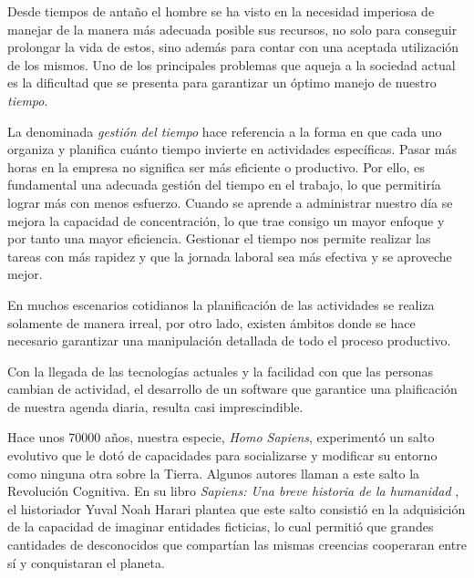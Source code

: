 \begin{introduction}
	Desde tiempos de antaño el hombre se ha visto en la necesidad imperiosa de manejar de la manera más adecuada posible sus recursos, no solo para conseguir prolongar la vida de estos, sino además para contar con una aceptada utilización de los mismos. Uno de los principales problemas que aqueja a la sociedad actual es la dificultad que se presenta para garantizar un óptimo manejo de nuestro \textit{tiempo}.
	
	La denominada \textit{gestión del tiempo} hace referencia a la forma en que cada uno organiza y planifica cuánto tiempo invierte en actividades específicas. Pasar más horas en la empresa no significa ser más eficiente o productivo. Por ello, es fundamental una adecuada gestión del tiempo en el trabajo, lo que permitiría lograr más con menos esfuerzo. Cuando se aprende a administrar nuestro día se mejora la capacidad de concentración, lo que trae consigo un mayor enfoque y por tanto una mayor eficiencia. Gestionar el tiempo nos permite realizar las tareas con más rapidez y que la jornada laboral sea más efectiva y se aproveche mejor.
	
	En muchos escenarios cotidianos la planificación de las actividades se realiza solamente de manera irreal, por otro lado, existen ámbitos donde se hace necesario garantizar una manipulación detallada de todo el proceso productivo.
	
	Con la llegada de las tecnologías actuales y la facilidad con que las personas cambian de actividad, el desarrollo de un software que garantice una plaificación de nuestra agenda diaria, resulta casi imprescindible.
	
	
	
	
	
	Hace unos 70000 años, nuestra especie, \textit{Homo Sapiens}, experimentó un salto evolutivo que le dotó de capacidades para socializarse y modificar su entorno como ninguna otra sobre la Tierra. Algunos autores llaman a este salto la Revolución Cognitiva. En su libro \textit{Sapiens: Una breve historia de la humanidad }, el historiador Yuval Noah Harari plantea que este salto consistió en la adquisición de la capacidad de imaginar entidades ficticias, lo cual permitió que grandes cantidades de desconocidos que compartían las mismas creencias cooperaran entre sí y conquistaran el planeta.\cite{harari2014sapiens}
	

\end{introduction}
